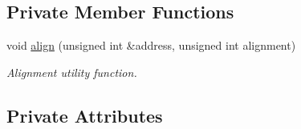 \subsection*{Private Member Functions}
\begin{DoxyCompactItemize}
\item 
void \hyperlink{classmemory_a30018e73a41b777c95319b62cfc79b81}{align} (unsigned int \&address, unsigned int alignment)
\begin{DoxyCompactList}\small\item\em Alignment utility function. \end{DoxyCompactList}\end{DoxyCompactItemize}
\subsection*{Private Attributes}
